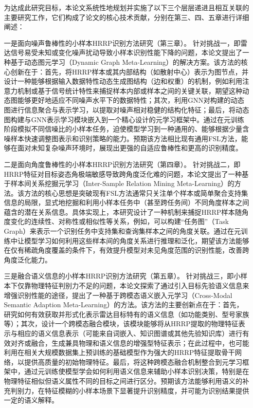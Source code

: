 {%
为达成此研究目标，本论文系统性地规划并实施了以下三个层层递进且相互关联的主要研究工作，它们构成了论文的核心技术贡献，分别在第三、四、五章进行详细阐述：

{一是面向噪声鲁棒性的小样本HRRP识别方法研究（第三章）。} 针对{挑战一}，即雷达信号易受未知或变化噪声扰动导致小样本识别性能下降的问题，本论文提出了一种基于{动态图元学习（Dynamic Graph Meta-Learning）}的解决方案。该方法的核心创新在于：首先，将HRRP样本或其内部结构（如散射中心）表示为图节点，并设计一种能够根据输入数据特性动态生成图结构（边和权重）的机制，例如利用注意力机制或基于信号统计特性来捕捉样本内部或样本之间的关键关联，期望这种动态图能够更好地适应不同噪声水平下的数据特性；其次，利用GNN对构建的动态图进行信息聚合与表示学习，以提取对噪声相对稳健的结构化特征；最后，将动态图构建与GNN表示学习模块嵌入到一个精心设计的元学习框架中。通过在元训练阶段模拟不同信噪比的小样本任务，迫使模型学习到一种通用的、能够根据少量含噪样本快速调整图表示和识别策略的能力。预期该方法相比现有通用FSL方法，能够在面对未知复杂噪声环境时，展现出更强的自适应鲁棒性和更高的识别精度。

{二是面向角度鲁棒性的小样本HRRP识别方法研究（第四章）。} 针对{挑战二}，即HRRP特征对目标姿态角极端敏感导致跨角度泛化难的问题，本论文提出了一种基于{样本间关系挖掘元学习（Inter-Sample Relation Mining Meta-Learning）}的方法。该方法的核心思想是突破现有FSL方法通常只关注单个样本或简单聚合支持集信息的局限，显式地挖掘和利用小样本任务中（甚至跨任务间）不同角度样本之间蕴含的潜在关系信息。具体实现上，本研究设计了一种机制来捕捉HRRP样本随角度变化的连续性、对称性或相似性等关系，例如，可以构建“任务图”（Task Graph）来表示一个识别任务中支持集和查询集样本之间的角度关联。通过在元训练中让模型学习如何利用这些样本间的角度关系进行推理和泛化，期望该方法能够在仅有稀疏角度覆盖的条件下，有效提升模型对未见角度范围的识别性能，改善跨角度泛化能力。

{三是融合语义信息的小样本HRRP识别方法研究（第五章）。} 针对{挑战三}，即小样本下仅靠物理特征判别力不足的问题，本论文探索了通过引入目标先验语义信息来增强识别性能的途径，提出了一种基于{跨模态语义嵌入元学习（Cross-Modal Semantic Adaption Meta-Learning）}的方法。该方法的主要创新点在于：首先，研究如何有效获取并形式化表示雷达目标特有的语义信息（如功能类别、型号家族等）；其次，设计一个跨模态融合模块，该模块能够将从HRRP提取的物理特征表示与相应的语义信息表示（可能来自词嵌入、知识图谱或其他先验知识库）进行有效对齐或融合，生成兼具物理和语义信息的增强型特征表示；在此过程中，也可能利用在相关大规模数据集上预训练的{基础模型}作为强大的HRRP特征提取骨干网络，以提供高质量的初始物理特征。最后，将这种跨模态融合机制整合到元学习框架中，通过元训练使模型学会如何利用语义信息来辅助小样本识别决策，特别是在物理特征相似但语义属性不同的目标之间进行区分。预期该方法能够利用语义的补充判别力，在特征模糊的小样本场景下显著提升识别精度，并可能为识别结果提供一定的语义解释。

}
